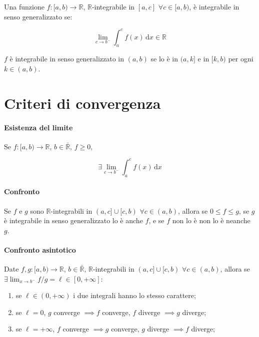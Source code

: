 \documentclass[12pt,a4paper]{report}
\numberwithin{equation}{section}
\theoremstyle{definition}
\theoremstyle{remark}
\begin{document}
Una funzione $f: [a, b) \rightarrow \mathbb{R}$, $\mathbb{R}$-integrabile in $[a, c]$ $\forall c \in [a, b)$, è integrabile in senso generalizzato se:

\begin{equation}
\lim_{c \rightarrow b^-} \int^{c}_{a} f(x) \, \text{d} x \in \mathbb{R}
\end{equation}

$f$ è integrabile in senso generalizzato in $(a, b)$ se lo è in $(a, k]$ e in $[k, b)$ per ogni $k \in (a, b)$. 

\section{Criteri di convergenza}

\paragraph{Esistenza del limite}

Se $f: [a, b) \rightarrow \mathbb{R}$, $b \in \bar{\mathbb{R}}$, $f \geq 0$,

\begin{equation}
\exists \lim_{c \rightarrow b^-} \int^{c}_{a} f(x) \, \text{d} x
\end{equation}

\paragraph{Confronto}

Se $f$ e $g$ sono $\mathbb{R}$-integrabili in $(a, c] \cup [c, b)$ $\forall c \in (a, b)$, allora se $0\leq f \leq g$, se $g$ è integrabile in senso generalizzato lo è anche $f$, e se $f$ non lo è non lo è neanche $g$.

\paragraph{Confronto asintotico}

Date $f, g: [a, b) \rightarrow \mathbb{R}$, $b \in \bar{\mathbb{R}}$, $\mathbb{R}$-integrabili in $(a, c] \cup [c, b)$ $\forall c \in (a, b)$, allora se $\exists \lim_{x\rightarrow b^{-}} f/g = \ell \in [0, +\infty]$:

\begin{enumerate}
\item se $\ell \in (0, +\infty)$ i due integrali hanno lo stesso carattere;
\item se $\ell = 0$, $g$ converge $\implies f$ converge, $f$ diverge $\implies g$ diverge;
\item se $\ell = +\infty$, $f$ converge $\implies g$ converge, $g$ diverge $\implies f$ diverge;
\end{enumerate}
\end{document}
